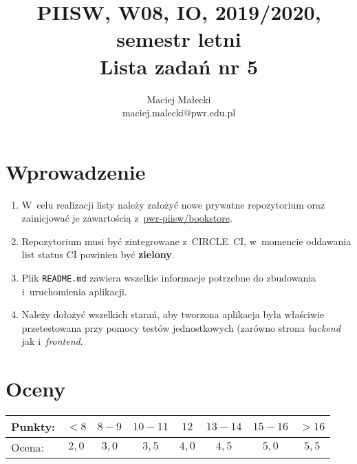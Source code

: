 \documentclass[12pt]{article}
\title{PIISW, W08, IO, 2019/2020, semestr letni\\Lista zadań nr 5}
\author{Maciej Małecki\\ \small maciej.malecki@pwr.edu.pl}
\begin{document}
    \maketitle

    \section*{Wprowadzenie}
        \begin{enumerate}
            \item W~celu realizacji listy należy założyć nowe prywatne repozytorium oraz zainicjować je zawartością z~\href{https://github.com/pwr-piisw/bookstore}{pwr-piisw/bookstore}.
			\item Repozytorium musi być zintegrowane z~CIRCLE~CI, w~momencie oddawania list status CI powinien być \textbf{zielony}.
			\item Plik \texttt{README.md} zawiera wszelkie informacje potrzebne do zbudowania i~uruchomienia aplikacji.
            \item Należy dołożyć wszelkich starań, aby tworzona aplikacja była właściwie przetestowana przy pomocy testów jednostkowych (zarówno strona \textit{backend} jak i~\textit{frontend}.
        \end{enumerate}

    \section*{Oceny}
    \begin{tabular}{|l|c|c|c|c|c|c|c|}
        \hline
        Punkty: & $<8$ & $8-9$ & $10-11$ & $12$ & $13-14$ & $15-16$ & $>16$ \\
        \hline
        Ocena:  & $2,0$ & $3,0$ & $3,5$ & $4,0$ & $4,5$ & $5,0$ & $5,5$ \\
        \hline
    \end{tabular}
\end{document}
